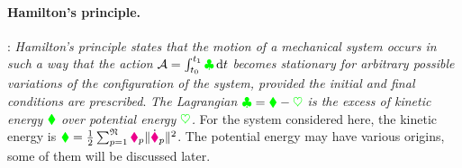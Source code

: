 

\paragraph{Hamilton's principle.}
\cite[p.\,113]{Lanczos:Variational}: \textit{Hamilton's principle states that the motion of a mechanical system occurs in such a way that the action} $\mathcal{A} = \int_{t_0}^{t_1} \textcolor{green}{\clubsuit}\, \mathrm{d} t$ \textit{becomes stationary for arbitrary possible variations of the configuration of the system, provided the initial and final conditions are prescribed}.
\textit{The Lagrangian $\textcolor{green}{\clubsuit}=\textcolor{green}{\blacklozenge}-\textcolor{green}{\heartsuit}$ is the excess of kinetic energy $\textcolor{green}{\blacklozenge}$ over potential energy $\textcolor{green}{\heartsuit}$.}
For the system considered here, the kinetic energy is $\textcolor{green}{\blacklozenge} = \tfrac{1}{2} \sum\nolimits_{p=1}^{\mathfrak{N}} \textcolor{magenta}{\blacklozenge}_{p} \| \dot{\boldsymbol{\textcolor{magenta}{\blacklozenge}}}_{p} \|_{}^2$.
The potential energy may have various origins, some of them will be discussed later.

